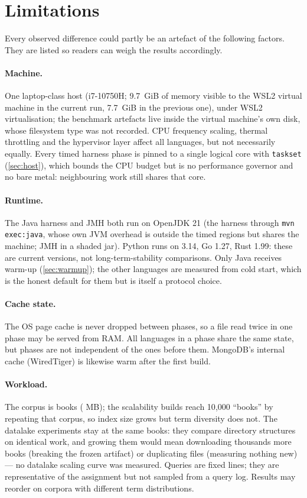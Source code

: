 \section{Limitations}
\label{sec:limitations}

Every observed difference could partly be an artefact of the following
factors. They are listed so readers can weigh the results accordingly.

\paragraph{Machine.}
One laptop-class host (i7-10750H; 9.7~GiB of memory visible to the WSL2
virtual machine in the current run, 7.7~GiB in the previous one), under WSL2
virtualisation; the benchmark artefacts live inside the virtual machine's own
disk, whose filesystem type was not recorded. CPU frequency scaling, thermal
throttling and the
hypervisor layer affect all languages, but not necessarily equally. Every
timed harness phase is pinned to a single logical core with \texttt{taskset}
(\cref{sec:host}), which bounds the CPU budget but is no performance governor
and no bare metal: neighbouring work still shares that core.

\paragraph{Runtime.}
The Java harness and JMH both run on OpenJDK 21 (the harness through
\texttt{mvn exec:java}, whose own JVM overhead is outside the timed regions
but shares the machine; JMH in a shaded jar). Python runs on 3.14, Go 1.27,
Rust 1.99: these are current
versions, not long-term-stability comparisons. Only Java receives warm-up
(\cref{sec:warmup}); the other languages are measured from cold start, which
is the honest default for them but is itself a protocol choice.

\paragraph{Cache state.}
The OS page cache is never dropped between phases, so a file read twice in
one phase may be served from RAM. All languages in a phase share the same
state, but phases are not independent of the ones before them. MongoDB's
internal cache (WiredTiger) is likewise warm after the first build.

\paragraph{Workload.}
The corpus is  books ( MB); the scalability
builds reach 10{,}000 ``books'' by repeating that corpus, so index size
grows but term diversity does not. The datalake experiments stay at the same  books: they compare
directory structures on identical work, and growing them would mean
downloading thousands more books (breaking the frozen artifact) or
duplicating files (measuring nothing new) --- no datalake scaling curve was
measured. Queries are  fixed lines; they are
representative of the assignment but not sampled from a query log.
Results may reorder on corpora with different term distributions.

